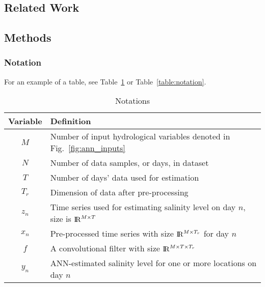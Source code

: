 
\blindtext 
\blindtext

\subsection{Related Work}

\blindtext
\blindtext
\blindtext

\subsection{Methods}

\blindtext

\subsubsection{Notation}

For an example of a table, see Table~\ref{table:variables} or Table~\ref{table:notation}.

\begin{table}[htb]
	\caption{Notations}
	\label{table:variables}
	\centering
	\begin{tabular}[]{c|l}
		\toprule
		Variable & Definition \\
		\midrule
		$M$ & Number of input hydrological variables denoted in Fig.~\ref{fig:ann_inputs}\\
		\hline
		$N$ & Number of data samples, or days, in dataset \\
		\hline
		$T$ & Number of days' data used for estimation \\
		\hline
		$T_r$ & Dimension of data after pre-processing\\
		\hline
		$z_{n}$ & Time series used for estimating salinity level on day $n$, size is ${\rm I\!R}^{M\times T}$ \\
		\hline
		$x_{n}$ & Pre-processed time series with size ${\rm I\!R}^{M\times T_r}$ for day $n$\\
		\hline
		$f$ & A convolutional filter with size ${\rm I\!R}^{M \times T \times T_r}$ \\
		\hline
		$y_{n}$ & ANN-estimated salinity level for one or more locations on day $n$ \\
		\bottomrule
	\end{tabular}
\end{table}



